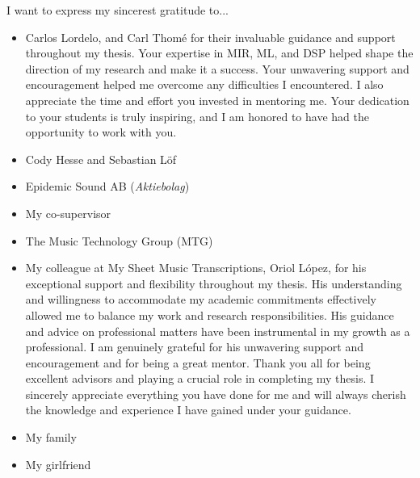 

\begin{acknowledgement}

I want to express my sincerest gratitude to...

\begin{itemize}
\item Carlos Lordelo, and Carl Thomé for their invaluable guidance and support throughout my thesis. Your expertise in MIR, ML, and DSP helped shape the direction of my research and make it a success. Your unwavering support and encouragement helped me overcome any difficulties I encountered. I also appreciate the time and effort you invested in mentoring me. Your dedication to your students is truly inspiring, and I am honored to have had the opportunity to work with you.
\vspace*{3mm}
\item Cody Hesse and Sebastian Löf
\vspace*{3mm}
\item Epidemic Sound AB (\textit{Aktiebolag})
\vspace*{3mm}
\item My co-supervisor
\vspace*{3mm}
\item The Music Technology Group (MTG)
\vspace*{3mm}
\item My colleague at My Sheet Music Transcriptions, Oriol López, for his exceptional support and flexibility throughout my thesis. His understanding and willingness to accommodate my academic commitments effectively allowed me to balance my work and research responsibilities. His guidance and advice on professional matters have been instrumental in my growth as a professional. I am genuinely grateful for his unwavering support and encouragement and for being a great mentor.
\vspace*{3mm}
Thank you all for being excellent advisors and playing a crucial role in completing my thesis. I sincerely appreciate everything you have done for me and will always cherish the knowledge and experience I have gained under your guidance.
\vspace*{3mm}
\item My family
\vspace*{3mm}
\item My girlfriend
\vspace*{3mm}
\end{itemize}

\newpage
\end{acknowledgement}